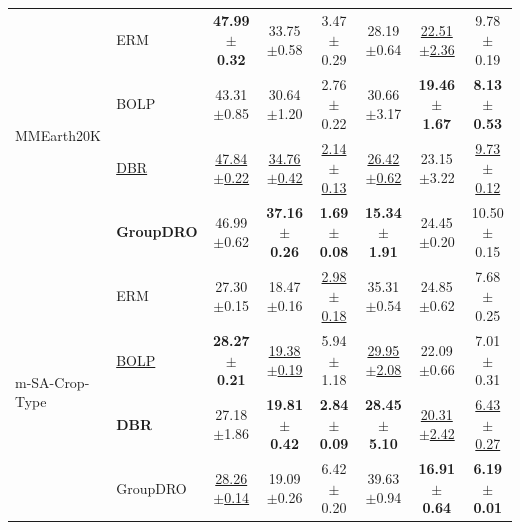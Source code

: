 \documentclass[10pt,twocolumn,letterpaper]{article}
\begin{document}
\begin{table}[t]
{\begin{tabular}{llcccccc}
\midrule
\multirow{4}{*}{MMEarth20K} 
 & ERM & \textbf{47.99$\pm$0.32} & 33.75$\pm$0.58 & 3.47$\pm$0.29 & 28.19$\pm$0.64 & \underline{22.51$\pm$2.36} & 9.78$\pm$0.19 \\
 & BOLP & 43.31$\pm$0.85 & 30.64$\pm$1.20 & 2.76$\pm$0.22 & 30.66$\pm$3.17 & \textbf{19.46$\pm$1.67} & \textbf{8.13$\pm$0.53} \\
 & \underline{DBR} & \underline{47.84$\pm$0.22} & \underline{34.76$\pm$0.42} & \underline{2.14$\pm$0.13} & \underline{26.42$\pm$0.62} & 23.15$\pm$3.22 & \underline{9.73$\pm$0.12} \\
 & \textbf{GroupDRO} & 46.99$\pm$0.62 & \textbf{37.16$\pm$0.26} & \textbf{1.69$\pm$0.08} & \textbf{15.34$\pm$1.91} & 24.45$\pm$0.20 & 10.50$\pm$0.15 \\
\midrule
\multirow{4}{*}{m-SA-Crop-Type} 
 & ERM & 27.30$\pm$0.15 & 18.47$\pm$0.16 & \underline{2.98$\pm$0.18} & 35.31$\pm$0.54 & 24.85$\pm$0.62 & 7.68$\pm$0.25 \\
 & \underline{BOLP} & \textbf{28.27$\pm$0.21} & \underline{19.38$\pm$0.19} & 5.94$\pm$1.18 & \underline{29.95$\pm$2.08} & 22.09$\pm$0.66 & 7.01$\pm$0.31 \\
 & \textbf{DBR} & 27.18$\pm$1.86 & \textbf{19.81$\pm$0.42} & \textbf{2.84$\pm$0.09} & \textbf{28.45$\pm$5.10} & \underline{20.31$\pm$2.42} & \underline{6.43$\pm$0.27} \\
 & GroupDRO & \underline{28.26$\pm$0.14} & 19.09$\pm$0.26 & 6.42$\pm$0.20 & 39.63$\pm$0.94 & \textbf{16.91$\pm$0.64} & \textbf{6.19$\pm$0.01} \\
\bottomrule
\end{tabular}
}

\vspace{0.4em}


\end{table}
\end{document}
